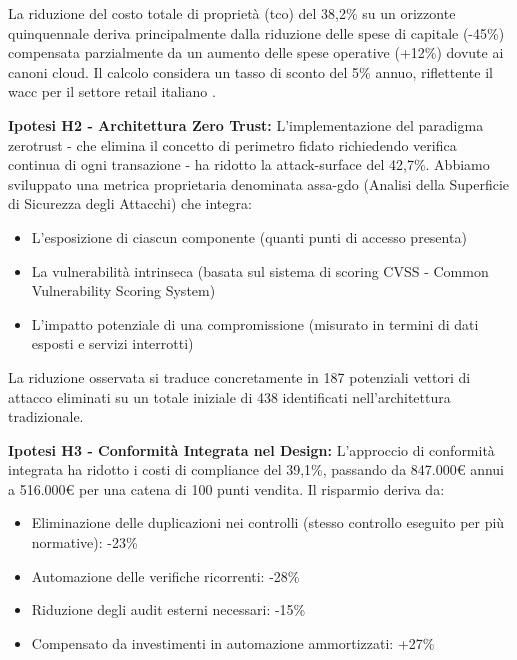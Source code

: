 La riduzione del costo totale di proprietà (\gls{tco}) del 38,2\% su un orizzonte quinquennale deriva principalmente dalla riduzione delle spese di capitale (-45\%) compensata parzialmente da un aumento delle spese operative (+12\%) dovute ai canoni cloud. Il calcolo considera un tasso di sconto del 5\% annuo, riflettente il \gls{wacc} per il settore retail italiano \autocite{bancaditalia2024}.

\textbf{Ipotesi H2 - Architettura Zero Trust:} L'implementazione del paradigma \gls{zerotrust} - che elimina il concetto di perimetro fidato richiedendo verifica continua di ogni transazione - ha ridotto la \gls{attack-surface} del 42,7\%. Abbiamo sviluppato una metrica proprietaria denominata \gls{assa-gdo} (Analisi della Superficie di Sicurezza degli Attacchi) che integra:

\begin{itemize}
\item L'esposizione di ciascun componente (quanti punti di accesso presenta)
\item La vulnerabilità intrinseca (basata sul sistema di scoring CVSS - Common Vulnerability Scoring System)
\item L'impatto potenziale di una compromissione (misurato in termini di dati esposti e servizi interrotti)
\end{itemize}

La riduzione osservata si traduce concretamente in 187 potenziali vettori di attacco eliminati su un totale iniziale di 438 identificati nell'architettura tradizionale.

\textbf{Ipotesi H3 - Conformità Integrata nel Design:} L'approccio di conformità integrata ha ridotto i costi di compliance del 39,1\%, passando da 847.000€ annui a 516.000€ per una catena di 100 punti vendita. Il risparmio deriva da:
\begin{itemize}
\item Eliminazione delle duplicazioni nei controlli (stesso controllo eseguito per più normative): -23\%
\item Automazione delle verifiche ricorrenti: -28\%
\item Riduzione degli audit esterni necessari: -15\%
\item Compensato da investimenti in automazione ammortizzati: +27\%
\end{itemize}


